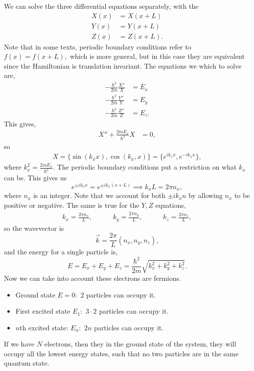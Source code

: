 \documentclass{article}
\numberwithin{equation}{section}
\begin{document}
We can solve the three differential equations separately, with the 
\begin{align}
    X(x) &= X(x+L) \\ 
    Y(x) &= Y(x+L) \\ 
    Z(x) &= Z(x+L).
\end{align}
Note that in some texts, periodic boundary conditions refer to $f(x)=f(x+L),$ which is more general, but in this case they are equivalent since the Hamiltonian is translation invariant. The equations we which to solve are,
\begin{align}
    -\frac{\hbar^2}{2m}\frac{X''}{X} &= E_x \\ 
    -\frac{\hbar^2}{2m}\frac{Y''}{Y} &= E_y \\
    -\frac{\hbar^2}{2m}\frac{Z''}{Z} &= E_z.
\end{align}
This gives,
\begin{align}
    X'' + \frac{2mE_x}{\hbar^2}X &= 0,
\end{align}
so 
\begin{align}
    X =\{\sin(k_xx),\cos(k_x,x)\} = \{e^{ik_xx},e^{-ik_xx}\},
\end{align}
where $k_x^2 = \frac{2mE_x}{\hbar^2}.$ The periodic boundary conditions put a restriction on what $k_x$ can be. This gives us 
\begin{equation}
    e^{\pm ik_xx} = e^{\pm ik_x(x+L)} \implies k_xL = 2\pi n_x,
\end{equation}
where $n_x$ is an integer. Note that we account for both $\pm ik_xn$ by allowing $n_x$ to be positive or negative. The same is true for the $Y,Z$ equations,
\begin{align}
    k_x=\frac{2\pi n_x}{L},\quad\quad\quad k_y=\frac{2\pi n_y}{L},\quad\quad\quad k_z=\frac{2\pi n_z}{L},
\end{align}
so the wavevector is 
\begin{equation}
    \vec{k} = \frac{2\pi}{L}(n_x,n_y,n_z),
\end{equation}
and the energy for a single particle is,
\begin{equation}
    E = E_x+E_y+E_z = \frac{\hbar^2}{2m} \sqrt{k_x^2+k_y^2+k_z^2}.
\end{equation}
Now we can take into account these electrons are fermions.
\begin{itemize}
    \item Ground state $E=0:$ $2$ particles can occupy it.
    \item First excited state $E_1:$ $3\cdot 2$ particles can occupy it.
    \item $n$th excited state: $E_n:$ $2n$ particles can occupy it.
\end{itemize}
If we have $N$ electrons, then they in the ground state of the system, they will occupy all the lowest energy states, such that no two particles are in the same quantum state.
\end{document}
